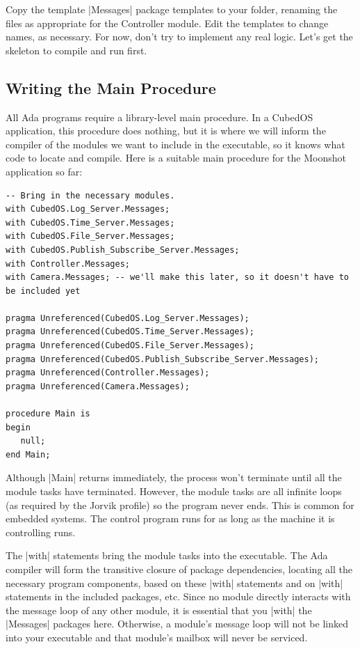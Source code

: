 Copy the template |Messages| package templates to your  folder, renaming the files
as appropriate for the Controller module. Edit the templates to change names, as necessary. For
now, don't try to implement any real logic. Let's get the skeleton to compile and run first.

\subsection{Writing the Main Procedure}
\label{sec:manual-tutorial-main-procedure}

All Ada programs require a library-level main procedure. In a CubedOS application, this
procedure does nothing, but it is where we will inform the compiler of the modules we want to
include in the executable, so it knows what code to locate and compile. Here is a suitable main
procedure for the Moonshot application so far:

\begin{verbatim}
-- Bring in the necessary modules.
with CubedOS.Log_Server.Messages;
with CubedOS.Time_Server.Messages;
with CubedOS.File_Server.Messages;
with CubedOS.Publish_Subscribe_Server.Messages;
with Controller.Messages;
with Camera.Messages; -- we'll make this later, so it doesn't have to be included yet

pragma Unreferenced(CubedOS.Log_Server.Messages);
pragma Unreferenced(CubedOS.Time_Server.Messages);
pragma Unreferenced(CubedOS.File_Server.Messages);
pragma Unreferenced(CubedOS.Publish_Subscribe_Server.Messages);
pragma Unreferenced(Controller.Messages);
pragma Unreferenced(Camera.Messages);

procedure Main is
begin
   null;
end Main;
\end{verbatim}

Although |Main| returns immediately, the process won't terminate until all the module tasks have
terminated. However, the module tasks are all infinite loops (as required by the Jorvik profile)
so the program never ends. This is common for embedded systems. The control program runs for as
long as the machine it is controlling runs.

The |with| statements bring the module tasks into the executable. The Ada compiler will form the
transitive closure of package dependencies, locating all the necessary program components, based
on these |with| statements and on |with| statements in the included packages, etc. Since no
module directly interacts with the message loop of any other module, it is essential that you
|with| the |Messages| packages here. Otherwise, a module's message loop will not be linked into
your executable and that module's mailbox will never be serviced.

